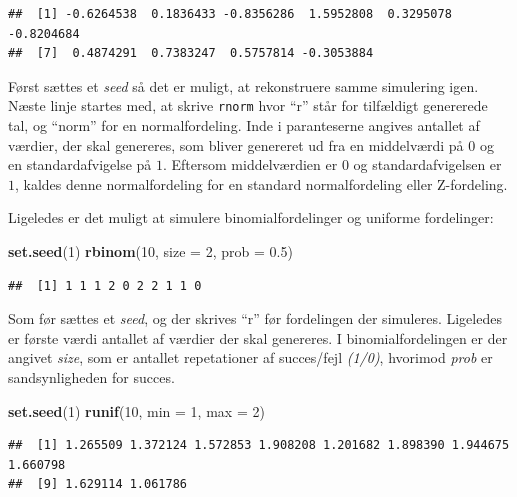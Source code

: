 \documentclass[
]{book}
\newenvironment{Shaded}{\begin{snugshade}}{\end{snugshade}}
\newcommand{\DataTypeTok}[1]{\textcolor[rgb]{0.13,0.29,0.53}{#1}}
\newcommand{\DecValTok}[1]{\textcolor[rgb]{0.00,0.00,0.81}{#1}}
\newcommand{\FloatTok}[1]{\textcolor[rgb]{0.00,0.00,0.81}{#1}}
\newcommand{\KeywordTok}[1]{\textcolor[rgb]{0.13,0.29,0.53}{\textbf{#1}}}
\newcommand{\NormalTok}[1]{#1}
\theoremstyle{definition}
\theoremstyle{definition}
\theoremstyle{definition}
\theoremstyle{remark}
\begin{document}
\begin{verbatim}
##  [1] -0.6264538  0.1836433 -0.8356286  1.5952808  0.3295078 -0.8204684
##  [7]  0.4874291  0.7383247  0.5757814 -0.3053884
\end{verbatim}

Først sættes et \emph{seed} så det er muligt, at rekonstruere samme simulering igen. Næste linje startes med, at skrive \texttt{rnorm} hvor ``r'' står for tilfældigt genererede tal, og ``norm'' for en normalfordeling. Inde i paranteserne angives antallet af værdier, der skal genereres, som bliver genereret ud fra en middelværdi på \(0\) og en standardafvigelse på \(1\). Eftersom middelværdien er \(0\) og standardafvigelsen er \(1\), kaldes denne normalfordeling for en standard normalfordeling eller Z-fordeling.

Ligeledes er det muligt at simulere binomialfordelinger og uniforme fordelinger:

\begin{Shaded}
\begin{Highlighting}[]
\KeywordTok{set.seed}\NormalTok{(}\DecValTok{1}\NormalTok{)}
\KeywordTok{rbinom}\NormalTok{(}\DecValTok{10}\NormalTok{, }\DataTypeTok{size =} \DecValTok{2}\NormalTok{, }\DataTypeTok{prob =} \FloatTok{0.5}\NormalTok{)}
\end{Highlighting}
\end{Shaded}

\begin{verbatim}
##  [1] 1 1 1 2 0 2 2 1 1 0
\end{verbatim}

Som før sættes et \emph{seed}, og der skrives ``r'' før fordelingen der simuleres. Ligeledes er første værdi antallet af værdier der skal genereres. I binomialfordelingen er der angivet \emph{size}, som er antallet repetationer af succes/fejl \emph{(1/0)}, hvorimod \emph{prob} er sandsynligheden for succes.

\begin{Shaded}
\begin{Highlighting}[]
\KeywordTok{set.seed}\NormalTok{(}\DecValTok{1}\NormalTok{)}
\KeywordTok{runif}\NormalTok{(}\DecValTok{10}\NormalTok{, }\DataTypeTok{min =} \DecValTok{1}\NormalTok{, }\DataTypeTok{max =} \DecValTok{2}\NormalTok{)}
\end{Highlighting}
\end{Shaded}

\begin{verbatim}
##  [1] 1.265509 1.372124 1.572853 1.908208 1.201682 1.898390 1.944675 1.660798
##  [9] 1.629114 1.061786
\end{verbatim}
\end{document}
